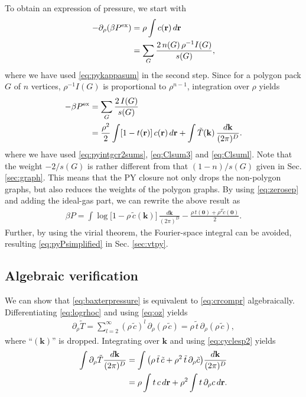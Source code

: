 \documentclass[aip,jcp,reprint,superscriptaddress]{revtex4-1}
\newcommand{\vct}[1]{\mathbf{#1}}
\providecommand{\vr}{} %
\renewcommand{\vr}{\vct{r}}
\newcommand{\vk}{\vct{k}}
\newcommand{\dvk}{\frac{d\vk}{(2\pi)^D}}
\newcommand{\supex}[1]{ { { #1 }^{ \mathrm{ex} } } }
\newcommand{\Pex}{\supex{P}}
\begin{document}
%
To obtain an expression of pressure,
  we start with\cite{hansen}
%
\begin{align}
  -\partial_\rho (\beta \Pex)
  &= \rho \int c(\vr) \, d\vr
  \notag \\
  &= \sum_{G} \frac{ 2 \, n(G) \, \rho^{-1} I(G) }{ s(G) },
\label{eq:crcompr}
\end{align}
where
we have used \eqref{eq:pykappasum} in the second step.
%
%
Since for a polygon pack $G$ of $n$ vertices, $\rho^{-1} I(G)$
  is proportional to $\rho^{n-1}$,
%
integration over $\rho$ yields\cite{baxterpressure}
%
\begin{align}
      -\beta \Pex
  &=  \sum_{G} \frac{ 2 \, I(G) }{ s(G) }
      \notag \\
  &=   \frac{ \rho^2 }{ 2 }
    \int [1 - t(\vr)]\, c(\vr) \, d\vr
      +\int \tilde{T}(\vk) \, \dvk.
\label{eq:baxterpressure}
\end{align}
%
where we have used
\eqref{eq:pyintgcr2sums}, \eqref{eq:Clsum3} and \eqref{eq:Clsuml}.
%
Note that the weight $-2/s(G)$ is rather different
  from that $(1-n)/s(G)$ given in Sec. \ref{sec:graph}.
%
This means that the PY closure not only drops the non-polygon graphs,
  but also reduces the weights of the polygon graphs.
%
By using \eqref{eq:zerosep} and adding the ideal-gas part,
  we can rewrite the above result as
%
\begin{align*}
      \beta P
    =
      \int \log\big[1 - \rho \, \tilde{c}(\vk)\big] \, \dvk
      -\frac{ \rho \, t(\vct{0}) + \rho^2 \tilde{c}(\vct0) }{2}.
\end{align*}
%
Further, by using the virial theorem,
the Fourier-space integral can be avoided,
resulting \eqref{eq:pyPsimplified} in Sec. \ref{sec:vtpy}.



\subsection{Algebraic verification}

We can show that
  \eqref{eq:baxterpressure} is equivalent to \eqref{eq:crcompr}
  algebraically\cite{baxterpressure}.
%
Differentiating \eqref{eq:logrhoc} and using \eqref{eq:oz} yields
%
\begin{align*}
  \partial_\rho \tilde T
=
  \sum_{l = 2}^{\infty}
    ( \rho \, \tilde{c} )^l
    \, \partial_\rho ( \rho \, \tilde{c} )
=
  \rho \, \tilde{t}
  \, \partial_\rho ( \rho \, \tilde{c} ),
\end{align*}
%
where ``$(\vk)$'' is dropped.
%
Integrating over $\vk$ and using \eqref{eq:cyclesp2} yields
%
\begin{align}
  \int \partial_\rho \tilde T \dvk
&=
  \int
    \big(
      \rho \, \tilde{t} \, \tilde{c}
      +
      \rho^2 \, \tilde{t} \, \partial_\rho \tilde{c}
    \big) \dvk
\notag \\
&=
  \rho \int t \, c \, d\vr
      +
  \rho^2 \int t \, \partial_\rho c \, d\vr.
\label{eq:intdlogrhoc}
\end{align}
\end{document}
